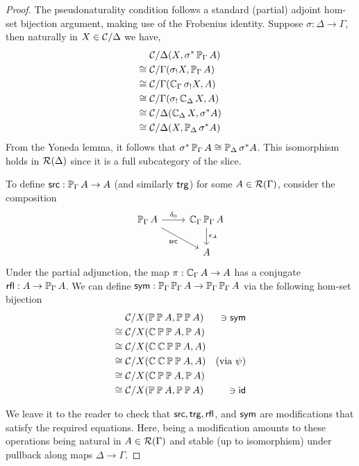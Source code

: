 \begin{proof}
  The pseudonaturality condition follows a standard
  (partial) adjoint hom-set bijection argument,
  making use of the Frobenius identity.
  Suppose $\sigma : \Delta \to \Gamma$,
  then naturally in $X \in \CC / \Delta$ we have,
  \begin{align*}
    & \CC / \Delta (X, \sigma^* \arr[\Gamma] A) \\
     \iso \; & \CC / \Gamma (\sigma_! X, \arr[\Gamma] A) \\
     \iso \; & \CC / \Gamma (\cyl[\Gamma] \sigma_! X, A) \\
     \iso \; & \CC / \Gamma (\sigma_! \cyl[\Delta] X, A) \\
     \iso \; & \CC / \Delta (\cyl[\Delta] X, \sigma^* A) \\
     \iso \; & \CC / \Delta (X, \arr[\Delta] \sigma^* A) \\
  \end{align*}
  From the Yoneda lemma,
  it follows that $\sigma^* \arr[\Gamma] A \iso \arr[\Delta] \sigma^* A$.
  This isomorphism holds in $\RR(\Delta)$ since it is a full
  subcategory of the slice.

  To define $\src : \arr[\Gamma] A \to A$ (and similarly $\trg$)
  for some $A \in \RR(\Gamma)$,
  consider the composition 
  \[ 
  \begin{tikzcd}
    {\arr[\Gamma]A} & {\cyl[\Gamma] \arr[\Gamma]{A}} \\
    & A
    \arrow["{\delta_0 }", from=1-1, to=1-2]
    \arrow["\src"', from=1-1, to=2-2]
    \arrow["{\epsilon_A}", from=1-2, to=2-2]
  \end{tikzcd}
  \]
  Under the partial adjunction,
  the map $\pi : \cyl[\Gamma] A \to A$ has a conjugate
  $\rfl : A \to \arr[\Gamma] A$.
  We can define
  $\sym : \arr[\Gamma] \arr[\Gamma] A \to \arr[\Gamma] \arr[\Gamma] A$
  via the following hom-set bijection
  \begin{align*}
    & \CC / X (\arr \arr A, \arr \arr A) & \ni \sym \\
    \iso \; & \CC / X (\cyl \arr \arr A, \arr A) \\
    \iso \; & \CC / X (\cyl \cyl \arr \arr A, A) \\
    \iso \; & \CC / X (\cyl \cyl \arr \arr A, A) & (\text{via } \psi) \\
    \iso \; & \CC / X (\cyl \arr \arr A, \arr A) \\
    \iso \; & \CC / X (\arr \arr A, \arr \arr A) & \ni \id
  \end{align*}
  
  We leave it to the reader to check that $\src, \trg, \rfl$,
  and $\sym$ are modifications
  that satisfy the required equations.
  Here, being a modification amounts to these operations being natural in
  $A \in \RR(\Gamma)$
  and stable (up to isomorphism) under pullback along maps $\Delta \to \Gamma$.
\end{proof}

